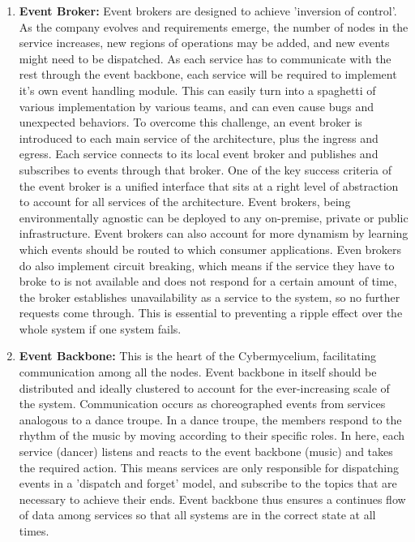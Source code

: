 \documentclass[review]{elsarticle}
\begin{document}
\begin{enumerate}
    \item \textbf{Event Broker:} Event brokers are designed to achieve 'inversion of control'. As the company evolves and requirements emerge, the number of nodes in the service increases, new regions of operations may be added, and new events might need to be dispatched. As each service has to communicate with the rest through the event backbone, each service will be required to implement it's own event handling module. This can easily turn into a spaghetti of various implementation by various teams, and can even cause bugs and unexpected behaviors. To overcome this challenge, an event broker is introduced to each main service of the architecture, plus the ingress and egress. Each service connects to its local event broker and publishes and subscribes to events through that broker. One of the key success criteria of the event broker is a unified interface that sits at a right level of abstraction to account for all services of the architecture. Event brokers, being environmentally agnostic can be deployed to any on-premise, private or public infrastructure. Event brokers can also account for more dynamism by learning which events should be routed to which consumer applications. Even brokers do also implement circuit breaking, which means if the service they have to broke to is not available and does not respond for a certain amount of time, the broker establishes unavailability as a service to the system, so no further requests come through. This is essential to preventing a ripple effect over the whole system if one system fails.
    \item \textbf{Event Backbone:} This is the heart of the Cybermycelium, facilitating communication among all the nodes. Event backbone in itself should be distributed and ideally clustered to account for the ever-increasing scale of the system. Communication occurs as choreographed events from services analogous to a dance troupe. In a dance troupe, the members respond to the rhythm of the music by moving according to their specific roles. In here, each service (dancer) listens and reacts to the event backbone (music) and takes the required action. This means services are only responsible for dispatching events in a 'dispatch and forget' model, and subscribe to the topics that are necessary to achieve their ends. Event backbone thus ensures a continues flow of data among services so that all systems are in the correct state at all times. 

\end{enumerate}
\end{document}
